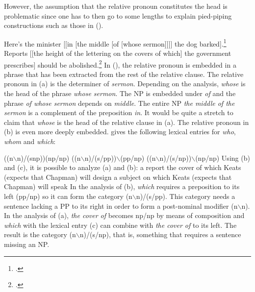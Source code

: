 However, the assumption that the relative pronoun constitutes the head is problematic since one has to then go to some lengths to explain pied-piping
constructions such as those in ().

\eal
\ex\label{Beispiel-Minister}
Here's the minister [[in [the middle [of [whose sermon]]]] the dog barked].\footnote{%
.
}
\ex Reports [[the height of the lettering on the covers of which] the government prescribes] should be
abolished.\label{Ross-reports}\footnote{%
.\nocite{Ross86a-u}
}
\zl
In (), the relative pronoun is embedded in a phrase that has been extracted from the rest of
the relative clause. The relative pronoun in (a) is the determiner of
\emph{sermon}. Depending on the analysis, \emph{whose} is the head of the phrase \emph{whose
  sermon}. The NP is embedded under \emph{of} and the phrase \emph{of whose sermon} depends on
\emph{middle}. The entire NP \emph{the middle of the sermon} is a complement of the preposition
\emph{in}. It would be quite a stretch to claim that \emph{whose} is the head of the relative clause
in (a). The relative pronoun in (b) is even more deeply embedded. \citet[]{Steedman97a} gives the following lexical entries for \emph{who}, \emph{whom} and \emph{which}:

\eal
\label{le-relpron-Steedman}
\settowidth{}
\ex ((n$\backslash$n)/(s\bs np))\bs (np/np)       
\ex ((n$\backslash$n)/(s/pp))$\backslash$(pp/np)  
\ex ((n$\backslash$n)/(s/np))$\backslash$(np/np)  
\zl
Using (b) and (c), it is possible to analyze (a) and (b):
\eal
\ex a report the cover of which Keats (expects that Chapman) will design
\ex a subject on which Keats (expects that Chapman) will speak
\zl
In the analysis of (b), \emph{which} requires a preposition to its left (pp/np) so it can form the category
(n$\backslash$n)/(s/pp). This category needs a sentence lacking a PP to its right in order to form a post-nominal
modifier (n$\backslash$n). In the analysis of (a), \emph{the cover of} becomes np/np by means
of composition and \emph{which} with the lexical entry (c) can combine with \emph{the cover of} to its left. The result is
the category (n$\backslash$n)/(s/np), that is, something that requires a sentence missing an NP.

